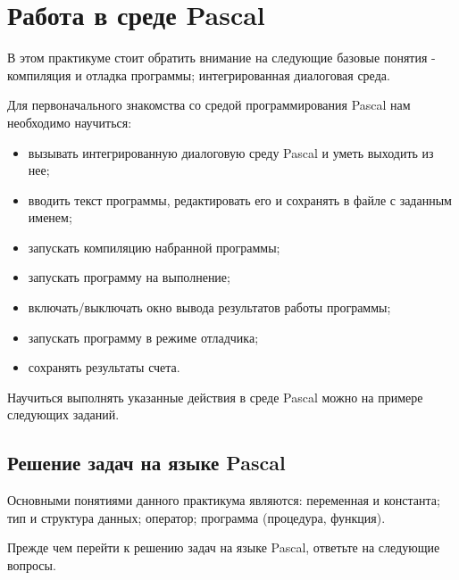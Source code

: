 \newpage
\section{Работа в среде  Pascal}

В этом практикуме стоит обратить внимание на следующие базовые понятия - компиляция и отладка программы; интегрированная диалоговая среда.

Для первоначального знакомства со средой программирования Pascal нам необходимо научиться:\begin{itemize}
	\item вызывать интегрированную диалоговую среду Pascal и уметь выходить из нее;
	\item вводить текст программы, редактировать его и сохранять в файле с заданным именем;
	\item запускать компиляцию набранной программы;
	\item запускать программу на выполнение;
	\item включать/выключать окно вывода результатов работы программы;
	\item запускать программу в режиме отладчика;
	\item сохранять результаты счета.
\end{itemize}

Научиться выполнять указанные действия в среде Pascal можно на примере следующих заданий.

\subsection{Решение задач на языке Pascal}

Основными понятиями данного практикума являются: переменная и константа; тип и структура данных; оператор; программа (процедура, функция).

Прежде чем перейти к решению задач на языке Pascal, ответьте на следующие вопросы.

